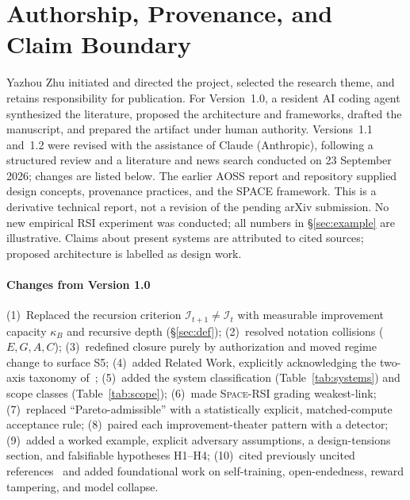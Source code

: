 \documentclass[11pt,a4paper]{article}
\newcommand{\spacersi}{\textsc{Space-RSI}}
\newcommand{\Imp}{\mathcal{I}}
\begin{document}
\section{Authorship, Provenance, and Claim Boundary}
Yazhou Zhu initiated and directed the project, selected the research theme, and retains responsibility for publication. For Version~1.0, a resident AI coding agent synthesized the literature, proposed the architecture and frameworks, drafted the manuscript, and prepared the artifact under human authority. Versions~1.1 and~1.2 were revised with the assistance of Claude (Anthropic), following a structured review and a literature and news search conducted on 23 September 2026; changes are listed below. The earlier AOSS report and repository supplied design concepts, provenance practices, and the SPACE framework. This is a derivative technical report, not a revision of the pending arXiv submission. No new empirical RSI experiment was conducted; all numbers in \S\ref{sec:example} are illustrative. Claims about present systems are attributed to cited sources; proposed architecture is labelled as design work.

\paragraph{Changes from Version 1.0}
(1)~Replaced the recursion criterion $\Imp_{t+1}\ne\Imp_t$ with measurable improvement capacity $\kappa_B$ and recursive depth (\S\ref{sec:def}); (2)~resolved notation collisions ($E, G, A, C$); (3)~redefined closure purely by authorization and moved regime change to surface S5; (4)~added Related Work, explicitly acknowledging the two-axis taxonomy of~\cite{chen2026survey}; (5)~added the system classification (Table~\ref{tab:systems}) and scope classes (Table~\ref{tab:scope}); (6)~made \spacersi{} grading weakest-link; (7)~replaced ``Pareto-admissible'' with a statistically explicit, matched-compute acceptance rule; (8)~paired each improvement-theater pattern with a detector; (9)~added a worked example, explicit adversary assumptions, a design-tensions section, and falsifiable hypotheses H1--H4; (10)~cited previously uncited references~\cite{everitt2016,greshake2023injection} and added foundational work on self-training, open-endedness, reward tampering, and model collapse.
\end{document}
